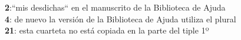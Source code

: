 \noindent \textbf{2}:``mis desdichas`` en el manuscrito de la Biblioteca de Ajuda\\
\textbf{4}: de nuevo la versión de la Biblioteca de Ajuda utiliza el plural\\
\textbf{21}: esta cuarteta no está copiada en la parte del tiple 1º

 
